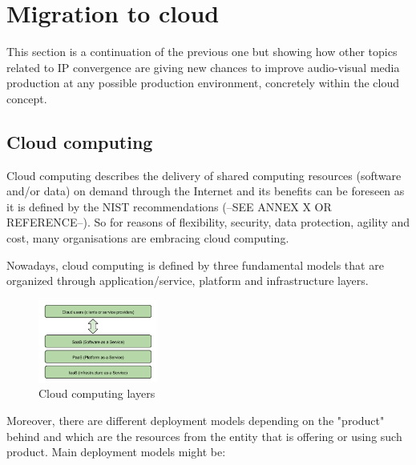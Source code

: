\section{Migration to cloud}

This section is a continuation of the previous one but showing how other topics related to IP convergence are giving new chances to improve audio-visual media production at any possible production environment, concretely within the cloud concept. 

\subsection{Cloud computing}

Cloud computing describes the delivery of shared computing resources (software and/or data) on demand through the Internet and its benefits can be foreseen as it is defined by the NIST recommendations (--SEE ANNEX X OR REFERENCE--). So for reasons of flexibility, security, data protection, agility and cost, many organisations are embracing cloud computing. 

Nowadays, cloud computing is defined by three fundamental models that are organized through application/service, platform and infrastructure layers.

\begin{figure}[htb]
\begin{center}
\includegraphics[width=0.35\textwidth]{./images/Cloud_computing_layers.png}
\caption{Cloud computing layers}
\label{F:cloudComputingLayers}
\end{center}
\end{figure}

Moreover, there are different deployment models depending on the "product" behind and which are the resources from the entity that is offering or using such product. Main deployment models might be:

